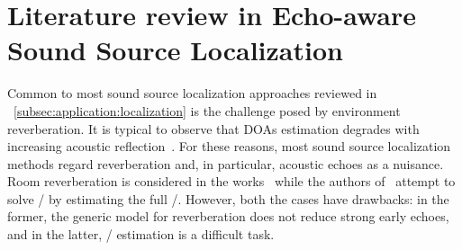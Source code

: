 




\section{Literature review in Echo-aware Sound Source Localization}
Common to most sound source localization approaches reviewed in ~\cref{subsec:application:localization} is the challenge posed by environment reverberation.
It is typical to observe that \ac{DOAs} estimation degrades with increasing acoustic reflection~.
For these reasons, most sound source localization methods regard reverberation and, in particular, acoustic echoes as a nuisance.
Room reverberation is considered in the works~ while the authors of~ attempt to solve \SSL/ by estimating the full \RIRs/.
However, both the cases have drawbacks: in the former, the generic model for reverberation does not reduce strong early echoes, and in the latter, \RIRs/ estimation is a difficult task.

